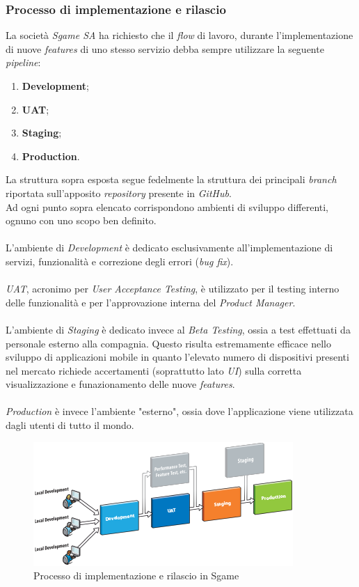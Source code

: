\documentclass[11pt]{thesistemp}
\begin{document}
\subsubsection{Processo di implementazione e rilascio}
La società \textit{Sgame SA} ha richiesto che il \textit{flow} di lavoro, durante l'implementazione di nuove \textit{features} di uno stesso servizio debba sempre utilizzare la seguente \textit{pipeline}:
\begin{enumerate}
	\item \textbf{Development};
	\item \textbf{UAT};
	\item \textbf{Staging};
	\item \textbf{Production}.
\end{enumerate}
La struttura sopra esposta segue fedelmente la struttura dei principali \textit{branch} riportata sull'apposito \textit{repository} presente in \textit{GitHub}.\\
Ad ogni punto sopra elencato corrispondono ambienti di sviluppo differenti, ognuno con uno scopo ben definito.\\\\
L'ambiente di \textit{Development} è dedicato esclusivamente all'implementazione di servizi, funzionalità e correzione degli errori (\textit{bug fix}).\\\\
\textit{UAT}, acronimo per \textit{User Acceptance Testing}, è utilizzato per il testing interno delle funzionalità e per l'approvazione interna del \textit{Product Manager}.\\\\
L'ambiente di \textit{Staging} è dedicato invece al \textit{Beta Testing}, ossia a test effettuati da personale esterno alla compagnia. Questo risulta estremamente efficace nello sviluppo di applicazioni mobile in quanto l'elevato numero di dispositivi presenti nel mercato richiede accertamenti (soprattutto lato \textit{UI}) sulla corretta visualizzazione e funazionamento delle nuove \textit{features}.\\\\
\textit{Production} è invece l'ambiente "esterno", ossia dove l'applicazione viene utilizzata dagli utenti di tutto il mondo.
\begin{figure}[h]
    \centering
    \includegraphics[scale=.85]{dev-flow.png}
        \caption{Processo di implementazione e rilascio in Sgame}
    \label{fig:dev-flow}
\end{figure}
\end{document}
